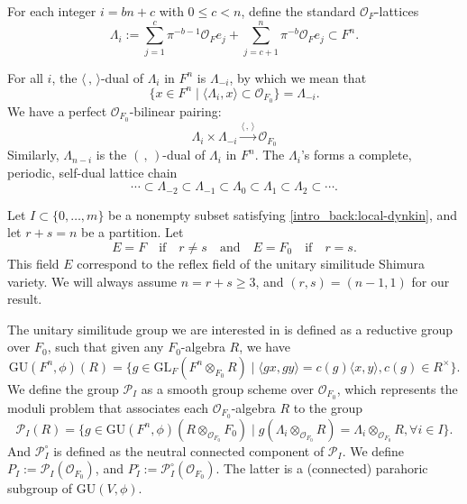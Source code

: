 \documentclass[pdflatex,sn-mathphys-num]{sn-jnl}%
\theoremstyle{thmstyleone}%
\theoremstyle{thmstyletwo}%
\numberwithin{equation}{subsection}
\theoremstyle{thmstylethree}%
\newcommand{\CO}{\ensuremath{\mathcal{O}}\xspace}
\newcommand{\CP}{\ensuremath{\mathcal{P}}\xspace}
\newcommand{\GL}{\mathrm{GL}}
\newcommand{\GU}{\mathrm{GU}}
\begin{document}
For each integer $i=bn+c$ with $0\leq c<n$, define the standard $\CO_F$-lattices
\begin{equation}\label{moduli_setup:lattice}
	\Lambda_i:=\sum_{j=1}^c\pi^{-b-1}\CO_F e_j+\sum_{j=c+1}^n\pi^{-b}\CO_F e_j\subset F^n.
\end{equation}
		
For all $i$, the $\langle\,,\,\rangle$-dual of $\Lambda_i$ in $F^n$ is $\Lambda_{-i}$, by which we mean that
\begin{equation*}
    \{x\in F^n\mid \langle \Lambda_i,x\rangle\subset\CO_{F_0}\}=\Lambda_{-i}.
\end{equation*}
We have a perfect $\CO_{F_0}$-bilinear pairing:
\begin{equation*}\label{moduli_setup:dual}
	\Lambda_i\times\Lambda_{-i}\xrightarrow{\langle\,,\,\rangle} \CO_{F_0}
\end{equation*}
Similarly, $\Lambda_{n-i}$ is the $(\,,\,)$-dual of $\Lambda_i$ in $F^n$. The $\Lambda_i$'s forms a complete, periodic, self-dual lattice chain
\begin{equation*}
    \cdots\subset\Lambda_{-2}\subset\Lambda_{-1}\subset\Lambda_0\subset\Lambda_1\subset\Lambda_2\subset\cdots.
\end{equation*}
		
Let $I \subset \{0,\dotsc,m\}$ be a nonempty subset satisfying \eqref{intro_back:local-dynkin}, and let $r + s = n$ be a partition.  Let
\begin{equation*}
    E = F \quad\text{if}\quad r \neq s \quad\text{and}\quad E = F_0 \quad\text{if}\quad r = s.
\end{equation*}
This field $E$ correspond to the reflex field of the unitary similitude Shimura variety. We will always assume $n=r+s\geq 3$, and  $(r,s)=(n-1,1)$ for our result.
		
The unitary similitude group we are interested in is defined as a reductive group over $F_0$, such that given any $F_0$-algebra $R$, we have
\begin{equation*}
	\GU(F^n,\phi)(R)=\{g\in\GL_F(F^n\otimes_{F_0}R)\mid \langle gx,gy\rangle=c(g)\langle x,y\rangle,c(g)\in R^\times\}.
\end{equation*}
We define the group $\CP_I$ as a smooth group scheme over $\CO_{F_0}$, which represents the moduli problem that associates each $\CO_{F_0}$-algebra $R$ to the group
\begin{equation*}\label{P_I}
	\CP_I(R)=\{g\in\GU(F^n,\phi)(R\otimes_{\CO_{F_0}}F_0)\mid g(\Lambda_i\otimes_{\CO_{F_0}}R)=\Lambda_i\otimes_{\CO_{F_0}}R,\forall i\in I\}.
\end{equation*}
And $\CP_I^\circ$ is defined as the neutral connected component of $\CP_I$. We define $P_I:=\CP_I(\CO_{F_0})$, and $P_I^\circ:=\CP_I^\circ(\CO_{F_0})$. The latter is a (connected) parahoric subgroup of $\GU(V,\phi)$.
\end{document}
